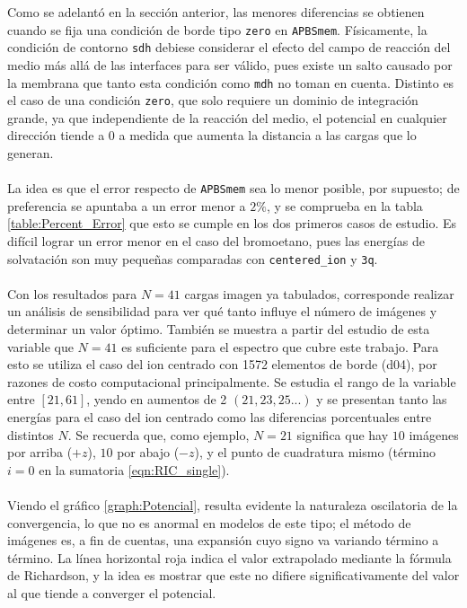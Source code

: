 \documentclass[12pt, twoside, onehalfspace, numbers, spanish]{ezthesis}
\numberwithin{equation}{section}
\begin{document}
\noindent
Como se adelantó en la sección anterior, las menores diferencias se obtienen cuando se fija una condición de borde tipo \texttt{zero} en \texttt{APBSmem}. Físicamente, la condición de contorno \texttt{sdh} debiese considerar el efecto del campo de reacción del medio más allá de las interfaces para ser válido, pues existe un salto causado por la membrana que tanto esta condición como \texttt{mdh} no toman en cuenta. Distinto es el caso de una condición \texttt{zero}, que solo requiere un dominio de integración grande, ya que independiente de la reacción del medio, el potencial en cualquier dirección tiende a $0$ a medida que aumenta la distancia a las cargas que lo generan.\\\\
La idea es que el error respecto de \texttt{APBSmem} sea lo menor posible, por supuesto; de preferencia se apuntaba a un error menor a $2\%$, y se comprueba en la tabla \ref{table:Percent_Error} que esto se cumple en los dos primeros casos de estudio. Es difícil lograr un error menor en el caso del bromoetano, pues las energías de solvatación son muy pequeñas comparadas con \texttt{centered\_ion} y \texttt{3q}.\\\\
Con los resultados para $N=41$ cargas imagen ya tabulados, corresponde realizar un análisis de sensibilidad para ver qué tanto influye el número de imágenes y determinar un valor óptimo. También se muestra a partir del estudio de esta variable que $N=41$ es suficiente para el espectro que cubre este trabajo. Para esto se utiliza el caso del ion centrado con 1572 elementos de borde (d04), por razones de costo computacional principalmente. Se estudia el rango de la variable entre $[21,61]$, yendo en aumentos de 2 $(21, 23, 25...)$ y se presentan tanto las energías para el caso del ion centrado como las diferencias porcentuales entre distintos $N$. Se recuerda que, como ejemplo, $N=21$ significa que hay $10$ imágenes por arriba ($+z$), $10$ por abajo ($-z$), y el punto de cuadratura mismo (término $i = 0$ en la sumatoria \ref{eqn:RIC_single}).\\\\
Viendo el gráfico \ref{graph:Potencial}, resulta evidente la naturaleza oscilatoria de la convergencia, lo que no es anormal en modelos de este tipo; el método de imágenes es, a fin de cuentas, una expansión cuyo signo va variando término a término. La línea horizontal roja indica el valor extrapolado mediante la fórmula de Richardson, y la idea es mostrar que este no difiere significativamente del valor al que tiende a converger el potencial.
\end{document}
